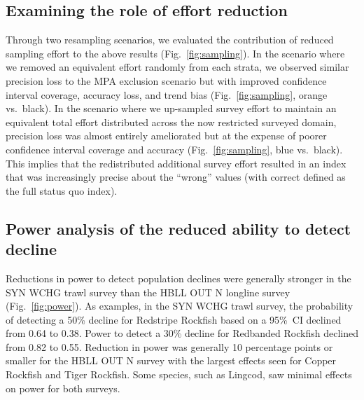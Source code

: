 \documentclass[12pt]{article}
\begin{document}
\subsection*{Examining the role of effort reduction}

Through two resampling scenarios, we evaluated the contribution of reduced sampling effort to the above results (Fig.~\ref{fig:sampling}).
In the scenario where we removed an equivalent effort randomly from each strata, we observed similar precision loss to the MPA exclusion scenario but with improved confidence interval coverage, accuracy loss, and trend bias (Fig.~\ref{fig:sampling}, orange vs.\ black).
In the scenario where we up-sampled survey effort to maintain an equivalent total effort distributed across the now restricted surveyed domain,
precision loss was almost entirely ameliorated but at the expense of poorer confidence interval coverage and accuracy (Fig.~\ref{fig:sampling}, blue vs.\ black).
This implies that the redistributed additional survey effort resulted in an index that was increasingly precise about the ``wrong'' values (with correct defined as the full status quo index).

\subsection*{Power analysis of the reduced ability to detect decline}

Reductions in power to detect population declines were generally stronger in the SYN WCHG trawl survey than the HBLL OUT N longline survey (Fig.~\ref{fig:power}).
As examples, in the SYN WCHG trawl survey, the probability of detecting a 50\% decline for Redstripe Rockfish based on a 95\%~CI declined from 0.64 to 0.38.
Power to detect a 30\% decline for Redbanded Rockfish declined from 0.82 to 0.55.
Reduction in power was generally 10 percentage points or smaller for the HBLL OUT N survey with the largest effects seen for Copper Rockfish and Tiger Rockfish.
Some species, such as Lingcod, saw minimal effects on power for both surveys.
\end{document}
